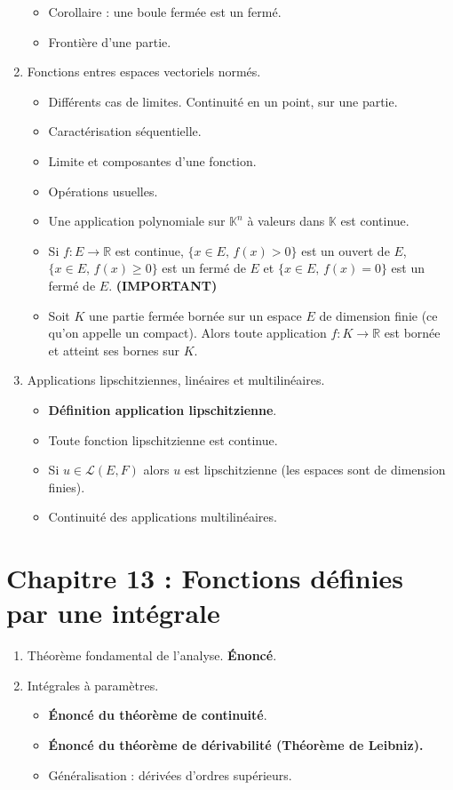 \documentclass[twoside,a4paper,french,10pt]{VcCours}
\begin{document}
\begin{enumerate}
\begin{itemize}
    \item Corollaire : une boule fermée est un fermé.
    \item Frontière d'une partie.
    \end{itemize}
    \item Fonctions entres espaces vectoriels normés.
    \begin{itemize}
    \item Différents cas de limites. Continuité en un point, sur une partie.
    \item Caractérisation séquentielle.
    \item Limite et composantes d'une fonction.
    \item Opérations usuelles.
    \item Une application polynomiale sur $\mathbb{K}^n$ à valeurs dans $\mathbb{K}$ est continue.
    \item Si $f : E \rightarrow \mathbb{R}$ est continue, $\lbrace x \in E, \, f(x)>0 \rbrace$ est un ouvert de $E$, $\lbrace x \in E, \, f(x) \geq 0 \rbrace$ est un fermé de $E$ et $\lbrace x \in E, \, f(x)=0 \rbrace$ est un fermé de $E$. \textbf{(IMPORTANT)} 
    \item Soit $K$ une partie fermée bornée sur un espace $E$ de dimension finie (ce qu'on appelle un compact). Alors toute application $f : K \rightarrow \mathbb{R}$ est bornée et atteint ses bornes sur $K$. 
    \end{itemize}
    \item Applications lipschitziennes, linéaires et multilinéaires.
    \begin{itemize}
    \item \textbf{Définition application lipschitzienne}.
    \item Toute fonction lipschitzienne est continue.
    \item Si $u \in \mathcal{L}(E,F)$ alors $u$ est lipschitzienne (les espaces sont de dimension finies).
    \item Continuité des applications multilinéaires.
    \end{itemize}
    \end{enumerate}


    \section*{Chapitre 13 : Fonctions définies par une intégrale}

      \begin{enumerate}
      \item Théorème fondamental de l'analyse. \textbf{Énoncé}.
      \item Intégrales à paramètres.
      \begin{itemize}
      \item \textbf{Énoncé du théorème de continuité}.
      \item \textbf{Énoncé du théorème de dérivabilité (Théorème de Leibniz).}
      \item Généralisation : dérivées d'ordres supérieurs.
      \end{itemize}
      \end{enumerate}
\end{document}
